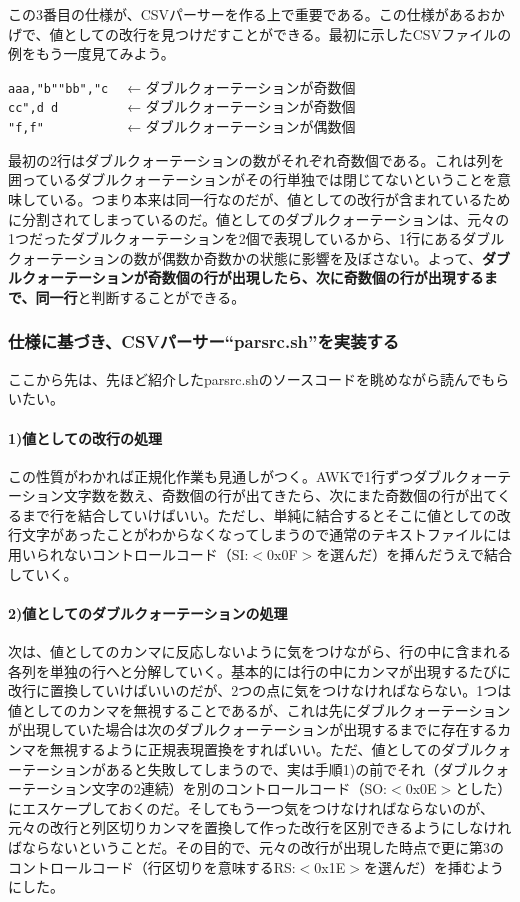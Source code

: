 この3番目の仕様が、CSVパーサーを作る上で重要である。この仕様があるおかげで、値としての改行を見つけだすことができる。最初に示したCSVファイルの例をもう一度見てみよう。\\
\begin{frameboxit}{160.0mm}
	\verb|aaa,"b""bb","c  | ← ダブルクォーテーションが奇数個 \\
	\verb|cc",d d         | ← ダブルクォーテーションが奇数個 \\
	\verb|"f,f"           | ← ダブルクォーテーションが偶数個
\end{frameboxit}

最初の2行はダブルクォーテーションの数がそれぞれ奇数個である。これは列を囲っているダブルクォーテーションがその行単独では閉じてないということを意味している。つまり本来は同一行なのだが、値としての改行が含まれているために分割されてしまっているのだ。値としてのダブルクォーテーションは、元々の1つだったダブルクォーテーションを2個で表現しているから、1行にあるダブルクォーテーションの数が偶数か奇数かの状態に影響を及ぼさない。よって、\textbf{ダブルクォーテーションが奇数個の行が出現したら、次に奇数個の行が出現するまで、同一行}と判断することができる。

\subsubsection*{仕様に基づき、CSVパーサー``parsrc.sh''を実装する}

ここから先は、先ほど紹介したparsrc.shのソースコードを眺めながら読んでもらいたい。

\paragraph{1)値としての改行の処理}
この性質がわかれば正規化作業も見通しがつく。AWKで1行ずつダブルクォーテーション文字数を数え、奇数個の行が出てきたら、次にまた奇数個の行が出てくるまで行を結合していけばいい。ただし、単純に結合するとそこに値としての改行文字があったことがわからなくなってしまうので通常のテキストファイルには用いられないコントロールコード（SI:$<$0x0F$>$を選んだ）を挿んだうえで結合していく。

\paragraph{2)値としてのダブルクォーテーションの処理}
次は、値としてのカンマに反応しないように気をつけながら、行の中に含まれる各列を単独の行へと分解していく。基本的には行の中にカンマが出現するたびに改行に置換していけばいいのだが、2つの点に気をつけなければならない。1つは値としてのカンマを無視することであるが、これは先にダブルクォーテーションが出現していた場合は次のダブルクォーテーションが出現するまでに存在するカンマを無視するように正規表現置換をすればいい。ただ、値としてのダブルクォーテーションがあると失敗してしまうので、実は手順1)の前でそれ（ダブルクォーテーション文字の2連続）を別のコントロールコード（SO:$<$0x0E$>$とした）にエスケープしておくのだ。そしてもう一つ気をつけなければならないのが、元々の改行と列区切りカンマを置換して作った改行を区別できるようにしなければならないということだ。その目的で、元々の改行が出現した時点で更に第3のコントロールコード（行区切りを意味するRS:$<$0x1E$>$を選んだ）を挿むようにした。

